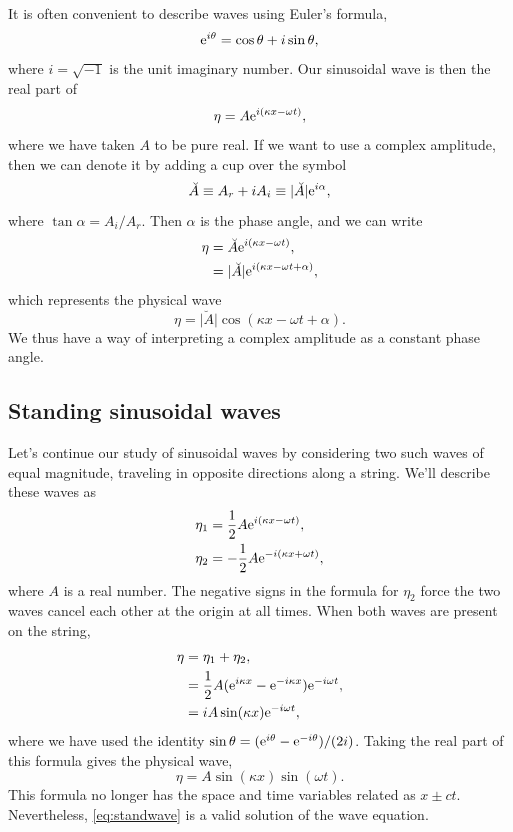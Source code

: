 \documentclass[11pt,twoside,a4paper]{article}
\begin{document}
It is often convenient to describe waves using Euler's formula,
\begin{equation}
  \label{eq:5}
  \textrm{e}^{i\theta} = \cos\theta + i\sin\theta, 
\end{equation}
where $i=\sqrt{-1}$ is the unit imaginary number.  Our sinusoidal wave
is then the real part of
\begin{displaymath}
  \eta = A\textrm{e}^{i(\kappa x - \omega t)},
\end{displaymath}
where we have taken $A$ to be pure real. If we want to use a complex
amplitude, then we can denote it by adding a cup over the symbol
\begin{equation}
  \label{eq:complexA}
  \breve{A}\equiv A_r + iA_i \equiv \vert\breve{A}\vert\textrm{e}^{i\alpha},
\end{equation}
where $\tan\alpha = A_i/A_r$.  Then $\alpha$ is the phase angle, and
we can write
\begin{align}
  \eta &= \breve{A}\textrm{e}^{i(\kappa x - \omega t)},\nonumber\\
       &= \vert\breve{A}\vert \textrm{e}^{i(\kappa x - \omega t+\alpha)},\nonumber
\end{align}
which represents the physical wave
\begin{displaymath}
  \eta = \vert\breve{A}\vert\cos(\kappa x - \omega t+\alpha).
\end{displaymath}
We thus have a way of interpreting a complex amplitude as a
constant phase angle.

\subsection{Standing sinusoidal waves}

Let's continue our study of sinusoidal waves by considering two such
waves of equal magnitude, traveling in opposite directions along a
string.  We'll describe these waves as 
\begin{align}
  \eta_1 &= \frac{1}{2}A\textrm{e}^{i(\kappa x - \omega t)},\nonumber\\
  \eta_2 &= -\frac{1}{2}A\textrm{e}^{-i(\kappa x + \omega t)},\nonumber
\end{align}
where $A$ is a real number.  The negative signs in the formula for
$\eta_2$ force the two waves cancel each other at the origin at all
times.  When both waves are present on the string,
\begin{align}
  \eta &= \eta_1 + \eta_2,\nonumber\\
       &= \frac{1}{2}A(\textrm{e}^{i\kappa x} - \textrm{e}^{-i\kappa x})\textrm{e}^{-i\omega t},\nonumber\\
       &= iA\sin(\kappa x)\textrm{e}^{-i\omega t},\nonumber
\end{align}
where we have used the identity
$\sin\theta=(\textrm{e}^{i\theta} - \textrm{e}^{-i\theta})/(2i)$. Taking the real
part of this formula gives the physical wave,
\begin{equation}
  \label{eq:standwave}
  \eta = A \sin(\kappa x)\sin(\omega t).
\end{equation}
This formula no longer has the space and time variables related as
$x\pm ct$.  Nevertheless, \autoref{eq:standwave} is a valid solution
of the wave equation.
\end{document}
